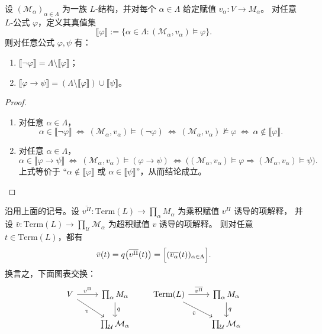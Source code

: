 \documentclass[lang=cn,a4paper,newtx,section]{elegantbook}
\begin{document}
\begin{lemma}[真值集的基本运算]
\label{truth-set}
设 $(\mathcal M_{\alpha})_{\alpha\in\Lambda}$ 为一族 $L$-结构，并对每个 $\alpha\in\Lambda$ 给定赋值 $v_{\alpha}:V\to M_{\alpha}$。
对任意 $L$-公式 $\varphi$，定义其真值集
\[
\llbracket\varphi\rrbracket:=\{\alpha\in\Lambda:(\mathcal M_{\alpha},v_{\alpha})\models\varphi\}.
\]
则对任意公式 $\varphi,\psi$ 有：
\begin{enumerate}
\item $\llbracket\neg\varphi\rrbracket=\Lambda\setminus\llbracket\varphi\rrbracket$；
\item $\llbracket\varphi\to\psi\rrbracket=(\Lambda\setminus\llbracket\varphi\rrbracket)\cup\llbracket\psi\rrbracket$。
\end{enumerate}
\end{lemma}

 \begin{proof}
 \begin{enumerate}
  \item 对任意 $\alpha\in\Lambda$，
   \[
     \alpha\in\llbracket\neg\varphi\rrbracket\ \Longleftrightarrow\ (\mathcal M_{\alpha},v_{\alpha})\models(\neg\varphi)\ \Longleftrightarrow\ (\mathcal M_{\alpha},v_{\alpha})\not\models\varphi\ \Longleftrightarrow\ \alpha\notin\llbracket\varphi\rrbracket.
   \]
  \item 对任意 $\alpha\in\Lambda$，
  \[
    \alpha\in\llbracket\varphi\to\psi\rrbracket\ \Longleftrightarrow\ (\mathcal M_{\alpha},v_{\alpha})\models(\varphi\to\psi)
    \ \Longleftrightarrow\ \bigl((\mathcal M_{\alpha},v_{\alpha})\models\varphi\Rightarrow(\mathcal M_{\alpha},v_{\alpha})\models\psi\bigr).
  \]
  上式等价于 ``$\alpha\notin\llbracket\varphi\rrbracket$ 或 $\alpha\in\llbracket\psi\rrbracket$''，从而结论成立。
\end{enumerate}
\end{proof}

\begin{proposition}[项在超积中的解释按分量计算]
\label{ultraproduct-term}
沿用上面的记号。设 $\overline{v^{\Pi}}:\mathrm{Term}(L)\to\prod_{\alpha}M_{\alpha}$ 为乘积赋值 $v^{\Pi}$ 诱导的项解释，
并设 $\bar v:\mathrm{Term}(L)\to\prod_{\mathcal U}\mathcal M_{\alpha}$ 为超积赋值 $v$ 诱导的项解释。
则对任意 $t\in\mathrm{Term}(L)$，都有
\[
  \bar v(t)=q\bigl(\overline{v^{\Pi}}(t)\bigr)=\Bigl[(\overline{v_{\alpha}}(t))_{\alpha\in\Lambda}\Bigr].
\]
换言之，下面图表交换：
\[
\begin{tikzcd}
V \arrow[r, "v^{\Pi}"] \arrow[dr, "v"'] & \prod_{\alpha}M_{\alpha} \arrow[d, "q"] \\
& \prod_{\mathcal U}\mathcal M_{\alpha}
\end{tikzcd}
\qquad
\begin{tikzcd}
\mathrm{Term}(L) \arrow[r, "\overline{v^{\Pi}}"] \arrow[dr, "\bar v"'] & \prod_{\alpha}M_{\alpha} \arrow[d, "q"] \\
& \prod_{\mathcal U}\mathcal M_{\alpha}
\end{tikzcd}
\]
\end{proposition}
\end{document}
